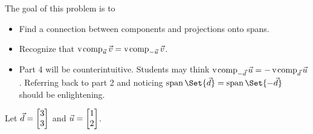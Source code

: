 	\bookonlynewpage
	\displayonlynewpage
	\question
	\begin{annotation}
		\begin{goals}

			The goal of this problem is to
			\begin{itemize}
				\item Find a connection between components and projections
					onto spans.
				\item Recognize that $\operatorname{\operatorname{v\hspace{1pt}comp}}_{\vec u}\vec v=\operatorname{\operatorname{v\hspace{1pt}comp}}_{-\vec u}\vec v$.
			\end{itemize}
		\end{goals}

		\begin{notes}
			\begin{itemize}
				\item Part 4 will be counterintuitive. Students may
					think $\operatorname{\operatorname{v\hspace{1pt}comp}}_{-\vec d}\vec u=-\operatorname{\operatorname{v\hspace{1pt}comp}}_{\vec d}\vec u$.
					Referring back to part 2 and noticing $\Span\Set{\vec d}=\Span\Set{-\vec d}$
					should be enlightening.
			\end{itemize}
		\end{notes}
	\end{annotation}
	Let $\vec d=\mat{3\\3}$ and $\vec u=\mat{1\\2}$.
